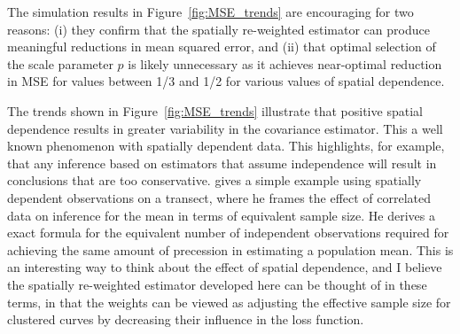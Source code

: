  The simulation results in Figure~\ref{fig:MSE_trends} are encouraging for two reasons: (i) they confirm that the spatially re-weighted estimator can produce meaningful reductions in mean squared error, and (ii) that optimal selection of the scale parameter $p$ is likely unnecessary as it achieves near-optimal reduction in MSE for values between 1/3 and 1/2 for various values of spatial dependence.

The trends shown in Figure~\ref{fig:MSE_trends} illustrate that positive spatial dependence results in greater variability in the covariance estimator. This a well known phenomenon with spatially dependent data. This highlights, for example, that any inference based on estimators that assume independence will result in conclusions that are too conservative. \cite{cressie1993statistics} gives a simple example using spatially dependent observations on a transect, where he frames the effect of correlated data on inference for the mean in terms of equivalent sample size. He derives a exact formula for the equivalent number of independent observations required for achieving the same amount of precession in estimating a population mean. This is an interesting way to think about the effect of spatial dependence, and I believe the spatially re-weighted estimator developed here can be thought of in these terms, in that the weights can be viewed as adjusting the effective sample size for clustered curves by decreasing their influence in the loss function. 


